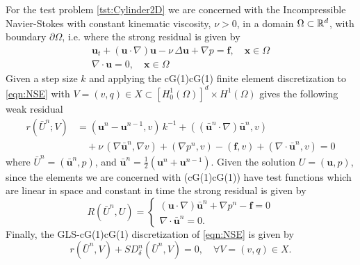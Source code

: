 For the test problem \ref{tst:Cylinder2D} we are concerned with the
Incompressible Navier-Stokes with constant kinematic viscosity, $\nu>0$, in a
domain $\Omega\subset \mathbb{R}^d$, with boundary $\partial \Omega$, i.e.  where the
strong residual is given by
\begin{equation}
    \begin{split}
      \mathbf{u}_t + \left( \mathbf{u} \cdot \nabla \right) \mathbf{u} - \nu\,
          \Delta \mathbf{u} + \nabla p = \mathbf{f}, \quad \mathbf{x} \in \Omega \\
          \nabla \cdot \mathbf{u} = 0, \quad \mathbf{x} \in \Omega
    \end{split}
  \label{eqn:NSE}
\end{equation}
Given a step size $k$ and applying the cG(1)cG(1) finite element discretization
to \autoref{eqn:NSE} with $V = (v, q) \in X \subset [H^1_0(\Omega)]^d \times
H^1(\Omega)$ gives the following weak residual
\begin{equation}
  \begin{split}
    r(\bar{U}^n; V) &= \left(\mathbf{u}^n - \mathbf{u}^{n-1}, v\right)\,k^{-1}
        + (\left( \bar{\mathbf{u}}^n \cdot \nabla \right) \bar{\mathbf{u}}^n, v) \\
        &\quad+ \nu\, (\nabla \bar{\mathbf{u}}^n, \nabla v)
        + (\nabla p^n, v) - (\mathbf{f}, v)
        + (\nabla \cdot \bar{\mathbf{u}}^n, v) = 0
  \end{split}
  \label{eqn:WeakNSE}
\end{equation}
where $\bar{U}^n = (\bar{\mathbf{u}}^n,p)$, and $\bar{\mathbf{u}}^n =
\frac{1}{2}\left(\mathbf{u}^n + \mathbf{u}^{n-1}\right)$. Given the solution
$U=(\mathbf{u},p)$, since the elements we are concerned with (cG(1)cG(1)) have
test functions which are linear in space and constant in time the strong
residual is given by
\begin{equation}
    R(\bar{U}^n,U) = \begin{cases}
      \left(\mathbf{u} \cdot \nabla \right) \bar{\mathbf{u}}^n
        + \nabla p^n - \mathbf{f} = 0 \\
      \nabla \cdot \bar{\mathbf{u}}^n = 0.
    \end{cases}
  \label{eqn:StrongNSE}
\end{equation}
Finally, the GLS-cG(1)cG(1) discretization of \eqref{eqn:NSE} is given by
\begin{equation}
  r(\bar{U}^n,V) + SD_{\delta}^n(\bar{U}^n,V) = 0, \quad \forall V=(v,q) \in X.
  \label{eqn:G2}
\end{equation}
